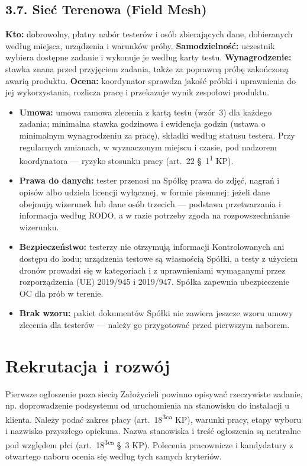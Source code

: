 \documentclass[11pt,a4paper]{report}
\begin{document}
\subsection*{3.7. Sieć Terenowa (Field Mesh)}
\textbf{Kto:} dobrowolny, płatny nabór testerów i osób zbierających dane, dobieranych według miejsca, urządzenia i warunków próby. \textbf{Samodzielność:} uczestnik wybiera dostępne zadanie i wykonuje je według karty testu. \textbf{Wynagrodzenie:} stawka znana przed przyjęciem zadania, także za poprawną próbę zakończoną awarią produktu. \textbf{Ocena:} koordynator sprawdza jakość próbki i uprawnienia do jej wykorzystania, rozlicza pracę i przekazuje wynik zespołowi produktu.
\begin{Prawo}
\begin{itemize}
  \item \textbf{Umowa:} umowa ramowa zlecenia z kartą testu (wzór~3) dla każdego zadania; minimalna stawka godzinowa i ewidencja godzin (ustawa o minimalnym wynagrodzeniu za pracę), składki według statusu testera. Przy regularnych zmianach, w wyznaczonym miejscu i czasie, pod nadzorem koordynatora --- ryzyko stosunku pracy (art.~22 §~1\textsuperscript{1} KP).
  \item \textbf{Prawa do danych:} tester przenosi na Spółkę prawa do zdjęć, nagrań i opisów albo udziela licencji wyłącznej, w formie pisemnej; jeżeli dane obejmują wizerunek lub dane osób trzecich --- podstawa przetwarzania i informacja według RODO, a w razie potrzeby zgoda na rozpowszechnianie wizerunku.
  \item \textbf{Bezpieczeństwo:} testerzy nie otrzymują informacji Kontrolowanych ani dostępu do kodu; urządzenia testowe są własnością Spółki, a testy z użyciem dronów prowadzi się w kategoriach i z uprawnieniami wymaganymi przez rozporządzenia (UE) 2019/945 i 2019/947. Spółka zapewnia ubezpieczenie OC dla prób w terenie.
  \item \textbf{Brak wzoru:} pakiet dokumentów Spółki nie zawiera jeszcze wzoru umowy zlecenia dla testerów --- należy go przygotować przed pierwszym naborem.
\end{itemize}
\end{Prawo}

\section{Rekrutacja i rozwój}

Pierwsze ogłoszenie poza siecią Założycieli powinno opisywać rzeczywiste zadanie, np. doprowadzenie podsystemu od uruchomienia na stanowisku do instalacji u klienta. Należy podać zakres płacy (art.~18\textsuperscript{3ca} KP), warunki pracy, etapy wyboru i nazwisko przyszłego opiekuna. Nazwa stanowiska i treść ogłoszenia są neutralne pod względem płci (art.~18\textsuperscript{3ca} §~3 KP). Polecenia pracownicze i kandydatury z otwartego naboru ocenia się według tych samych kryteriów.
\end{document}
